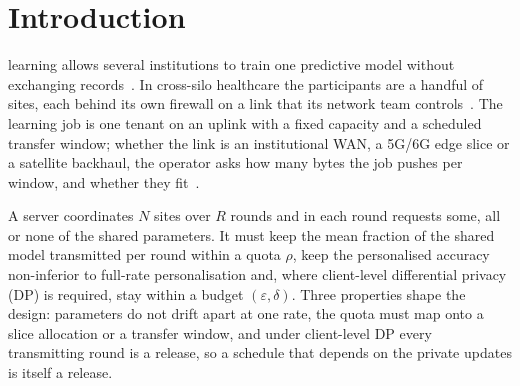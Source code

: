 \section{Introduction}
\label{sec:intro}

 learning allows several institutions to train one predictive model without exchanging records~\cite{mcmahan2017,kairouz2021}. In cross-silo healthcare the participants are a handful of sites, each behind its own firewall on a link that its network team controls~\cite{rieke2020,dayan2021}. The learning job is one tenant on an uplink with a fixed capacity and a scheduled transfer window; whether the link is an institutional WAN, a 5G/6G edge slice or a satellite backhaul, the operator asks how many bytes the job pushes per window, and whether they fit~\cite{lim2020,chen2021joint}.

A server coordinates $N$ sites over $R$ rounds and in each round requests some, all or none of the shared parameters. It must keep the mean fraction of the shared model transmitted per round within a quota $\rho$, keep the personalised accuracy non-inferior to full-rate personalisation and, where client-level differential privacy (DP) is required, stay within a budget $(\varepsilon,\delta)$. Three properties shape the design: parameters do not drift apart at one rate, the quota must map onto a slice allocation or a transfer window, and under client-level DP every transmitting round is a release, so a schedule that depends on the private updates is itself a release.

\begin{table}[t]
\caption{Positioning by method class (--: not addressed)}
\label{tab:positioning}
\centering\small
{}
\end{table}

